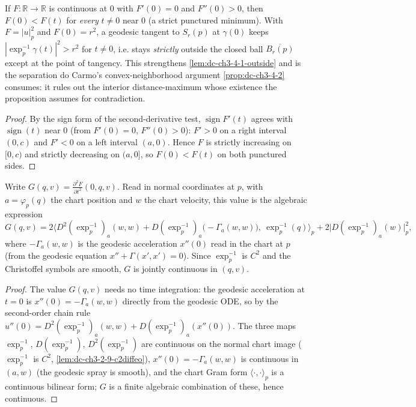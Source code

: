\begin{lemma}
  \label{lem:dc-ch3-4-1-strict-outside}
  \leanok
  If $F:\mathbb{R}\to\mathbb{R}$ is continuous at $0$ with $F'(0)=0$ and
  $F''(0)>0$, then $F(0)<F(t)$ for \emph{every} $t\neq0$ near $0$ (a strict
  punctured minimum). With $F=|u|_p^2$ and $F(0)=r^2$, a geodesic tangent to
  $S_r(p)$ at $\gamma(0)$ keeps $|\exp_p^{-1}\gamma(t)|^2>r^2$ for $t\neq0$, i.e.
  stays \emph{strictly} outside the closed ball $\overline{B_r(p)}$ except at the
  point of tangency. This strengthens \cref{lem:dc-ch3-4-1-outside} and is the
  separation do Carmo's convex-neighborhood argument \cref{prop:dc-ch3-4-2}
  consumes: it rules out the interior distance-maximum whose existence the
  proposition assumes for contradiction.
\end{lemma}
\begin{proof}
  \leanok
  By the sign form of the second-derivative test, $\operatorname{sign} F'(t)$
  agrees with $\operatorname{sign}(t)$ near $0$ (from $F'(0)=0$, $F''(0)>0$): $F'>0$
  on a right interval $(0,c)$ and $F'<0$ on a left interval $(a,0)$. Hence $F$ is
  strictly increasing on $[0,c)$ and strictly decreasing on $(a,0]$, so $F(0)<F(t)$
  on both punctured sides.
\end{proof}

\begin{lemma}
  \label{lem:dc-ch3-4-1-continuity}
  \leanok
  Write $G(q,v)=\frac{\partial^2 F}{\partial t^2}(0,q,v)$. Read in normal coordinates
  at $p$, with $a=\varphi_p(q)$ the chart position and $w$ the chart velocity, this
  value is the algebraic expression
  $$G(q,v)=2\big\langle D^2(\exp_p^{-1})_a(w,w)+D(\exp_p^{-1})_a\!\big(-\Gamma_a(w,w)\big),\ \exp_p^{-1}(q)\big\rangle_p
    +2\big|D(\exp_p^{-1})_a(w)\big|_p^2,$$
  where $-\Gamma_a(w,w)$ is the geodesic acceleration $x''(0)$ read in the chart at
  $p$ (from the geodesic equation $x''+\Gamma(x',x')=0$). Since $\exp_p^{-1}$ is $C^2$
  and the Christoffel symbols are smooth, $G$ is jointly continuous in $(q,v)$.
\end{lemma}
\begin{proof}
  \leanok
  The value $G(q,v)$ needs no time integration: the geodesic acceleration at $t=0$
  is $x''(0)=-\Gamma_a(w,w)$ directly from the geodesic ODE, so by the second-order
  chain rule $u''(0)=D^2(\exp_p^{-1})_a(w,w)+D(\exp_p^{-1})_a(x''(0))$. The three maps
  $\exp_p^{-1}$, $D(\exp_p^{-1})$, $D^2(\exp_p^{-1})$ are continuous on the normal chart
  image ($\exp_p^{-1}$ is $C^2$, \cref{lem:dc-ch3-2-9-c2diffeo}), $x''(0)=-\Gamma_a(w,w)$
  is continuous in $(a,w)$ (the geodesic spray is smooth), and the chart Gram form
  $\langle\cdot,\cdot\rangle_p$ is a continuous bilinear form; $G$ is a finite algebraic
  combination of these, hence continuous.
\end{proof}


